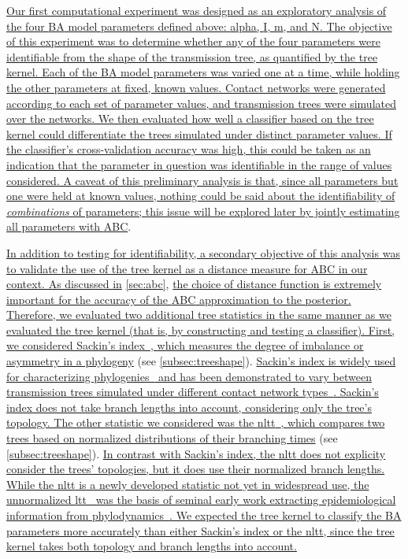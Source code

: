 {\color{blue}\uline{
Our first computational experiment was designed as an exploratory analysis of
the four \gls{BA} model parameters defined above: \gls{alpha}, \gls{I},
\gls{m}, and \gls{N}. The objective of this experiment was to determine whether
any of the four parameters were identifiable from the shape of the transmission
tree, as quantified by the tree kernel. Each of the \gls{BA} model parameters
was varied one at a time, while holding the other parameters at fixed, known
values. Contact networks were generated according to each set of parameter
values, and transmission trees were simulated over the networks. We then
evaluated how well a classifier based on the tree kernel could differentiate
the trees simulated under distinct parameter values. If the classifier's
cross-validation accuracy was high, this could be taken as an indication that
the parameter in question was identifiable in the range of values considered. 
A caveat of this preliminary analysis is that, since all parameters but one
were held at known values, nothing could be said about the identifiability of
\emph{combinations} of parameters; this issue will be explored later by jointly
estimating all parameters with \gls{ABC}}.

\uline{In addition to testing for identifiability, a secondary objective of
this analysis was to validate the use of the tree kernel as a distance measure
for \gls{ABC} in our context. As discussed in} \cref{sec:abc}, \uline{the
choice of distance function is extremely important for the accuracy of the
\gls{ABC} approximation to the posterior. Therefore, we evaluated two
additional tree statistics in the same manner as we evaluated the tree kernel
(that is, by constructing and testing a classifier). First, we considered
Sackin's index~\autocite{shao1990tree}, which measures the degree of imbalance
or asymmetry in a phylogeny} (see \cref{subsec:treeshape}). \uline{Sackin's
index is widely used for characterizing
phylogenies~\autocite{frost2013modelling} and has been demonstrated to vary
between transmission trees simulated under different contact network
types~\autocite{leventhal2012inferring}. Sackin's index does not take branch
lengths into account, considering only the tree's topology. The other statistic
we considered was the \gls{nltt}~\autocite{janzen2015approximate}, which
compares two trees based on normalized distributions of their branching times}
(see \cref{subsec:treeshape}).  \uline{In contrast with Sackin's index, the
\gls{nltt} does not explicity consider the trees' topologies, but it does use
their normalized branch lengths. While the \gls{nltt} is a newly developed
statistic not yet in widespread use, the unnormalized
\gls{ltt}~\autocite{nee1992tempo} was the basis of seminal early work
extracting epidemiological information from
phylodynamics~\autocite{holmes1995revealing}. We expected the tree kernel to
classify the \gls{BA} parameters more accurately than either Sackin's index or
the \gls{nltt}, since the tree kernel takes both topology and branch lengths
into account. }}

